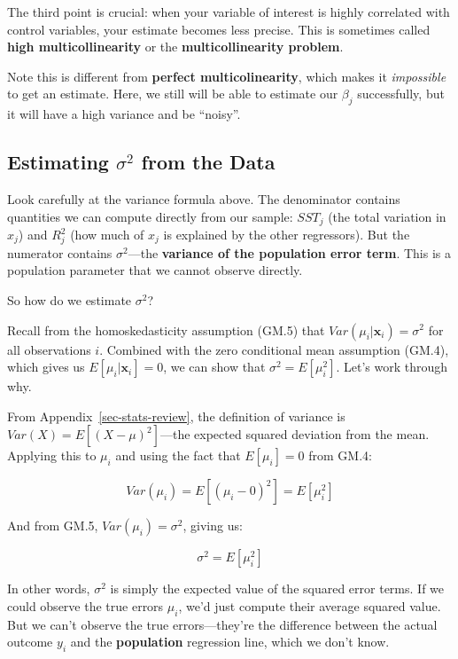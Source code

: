 \documentclass[
  letterpaper,
  DIV=11,
  numbers=noendperiod]{scrreprt}
\begin{document}
The third point is crucial: when your variable of interest is highly
correlated with control variables, your estimate becomes less precise.
This is sometimes called \textbf{high multicollinearity} or the
\textbf{multicollinearity problem}.

Note this is different from \textbf{perfect multicolinearity}, which
makes it \emph{impossible} to get an estimate. Here, we still will be
able to estimate our \(\beta_j\) successfully, but it will have a high
variance and be ``noisy''.

\subsection{\texorpdfstring{Estimating \(\sigma^2\) from the
Data}{Estimating \textbackslash sigma\^{}2 from the Data}}\label{estimating-sigma2-from-the-data}

Look carefully at the variance formula above. The denominator contains
quantities we can compute directly from our sample: \(SST_j\) (the total
variation in \(x_j\)) and \(R^2_j\) (how much of \(x_j\) is explained by
the other regressors). But the numerator contains \(\sigma^2\)---the
\textbf{variance of the population error term}. This is a population
parameter that we cannot observe directly.

So how do we estimate \(\sigma^2\)?

Recall from the homoskedasticity assumption (GM.5) that
\(Var(\mu_i | \mathbf{x}_i) = \sigma^2\) for all observations \(i\).
Combined with the zero conditional mean assumption (GM.4), which gives
us \(E[\mu_i | \mathbf{x}_i] = 0\), we can show that
\(\sigma^2 = E[\mu_i^2]\). Let's work through why.

From Appendix~\ref{sec-stats-review}, the definition of variance is
\(Var(X) = E[(X - \mu)^2]\)---the expected squared deviation from the
mean. Applying this to \(\mu_i\) and using the fact that
\(E[\mu_i] = 0\) from GM.4:

\[Var(\mu_i) = E[(\mu_i - 0)^2] = E[\mu_i^2]\]

And from GM.5, \(Var(\mu_i) = \sigma^2\), giving us:

\[\sigma^2 = E[\mu_i^2]\]

In other words, \(\sigma^2\) is simply the expected value of the squared
error terms. If we could observe the true errors \(\mu_i\), we'd just
compute their average squared value. But we can't observe the true
errors---they're the difference between the actual outcome \(y_i\) and
the \textbf{population} regression line, which we don't know.
\end{document}
